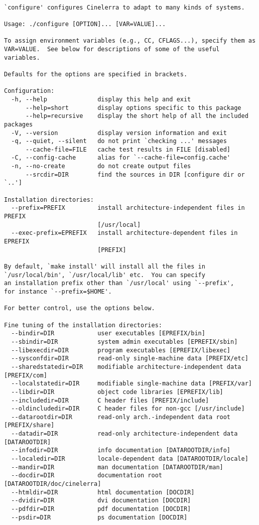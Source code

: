 \begingroup
    \fontsize{10pt}{12pt}\selectfont
\begin{verbatim}

`configure' configures Cinelerra to adapt to many kinds of systems.

Usage: ./configure [OPTION]... [VAR=VALUE]...

To assign environment variables (e.g., CC, CFLAGS...), specify them as
VAR=VALUE.  See below for descriptions of some of the useful variables.

Defaults for the options are specified in brackets.

Configuration:
  -h, --help              display this help and exit
      --help=short        display options specific to this package
      --help=recursive    display the short help of all the included packages
  -V, --version           display version information and exit
  -q, --quiet, --silent   do not print `checking ...' messages
      --cache-file=FILE   cache test results in FILE [disabled]
  -C, --config-cache      alias for `--cache-file=config.cache'
  -n, --no-create         do not create output files
      --srcdir=DIR        find the sources in DIR [configure dir or `..']

Installation directories:
  --prefix=PREFIX         install architecture-independent files in PREFIX
                          [/usr/local]
  --exec-prefix=EPREFIX   install architecture-dependent files in EPREFIX
                          [PREFIX]

By default, `make install' will install all the files in
`/usr/local/bin', `/usr/local/lib' etc.  You can specify
an installation prefix other than `/usr/local' using `--prefix',
for instance `--prefix=$HOME'.

For better control, use the options below.

Fine tuning of the installation directories:
  --bindir=DIR            user executables [EPREFIX/bin]
  --sbindir=DIR           system admin executables [EPREFIX/sbin]
  --libexecdir=DIR        program executables [EPREFIX/libexec]
  --sysconfdir=DIR        read-only single-machine data [PREFIX/etc]
  --sharedstatedir=DIR    modifiable architecture-independent data [PREFIX/com]
  --localstatedir=DIR     modifiable single-machine data [PREFIX/var]
  --libdir=DIR            object code libraries [EPREFIX/lib]
  --includedir=DIR        C header files [PREFIX/include]
  --oldincludedir=DIR     C header files for non-gcc [/usr/include]
  --datarootdir=DIR       read-only arch.-independent data root [PREFIX/share]
  --datadir=DIR           read-only architecture-independent data [DATAROOTDIR]
  --infodir=DIR           info documentation [DATAROOTDIR/info]
  --localedir=DIR         locale-dependent data [DATAROOTDIR/locale]
  --mandir=DIR            man documentation [DATAROOTDIR/man]
  --docdir=DIR            documentation root [DATAROOTDIR/doc/cinelerra]
  --htmldir=DIR           html documentation [DOCDIR]
  --dvidir=DIR            dvi documentation [DOCDIR]
  --pdfdir=DIR            pdf documentation [DOCDIR]
  --psdir=DIR             ps documentation [DOCDIR]


\end{verbatim}
